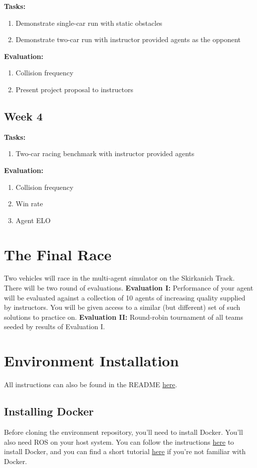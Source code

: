 \documentclass[letta4 paper]{article}
\numberwithin{equation}{section}
\newcommand{\0}{\mathbf{0}}
\begin{document}
	\textbf{Tasks: } \begin{enumerate}
		\item Demonstrate single-car run with static obstacles
		\item Demonstrate two-car run with instructor provided agents as the opponent
	\end{enumerate}
	
	\noindent\textbf{Evaluation: } \begin{enumerate}
		\item Collision frequency
		\item Present project proposal to instructors
	\end{enumerate}

	
	\subsection{Week 4}
	
	\textbf{Tasks: } \begin{enumerate}
		\item Two-car racing benchmark with instructor provided agents
	\end{enumerate}
	
	\noindent\textbf{Evaluation: } \begin{enumerate}
		\item Collision frequency
		\item Win rate
		\item Agent ELO
	\end{enumerate}
	
	\section{The Final Race}
	Two vehicles will race in the multi-agent simulator on the Skirkanich Track. There will be two round of evaluations. \textbf{Evaluation I: }Performance of your agent will be evaluated against a collection of 10 agents of increasing quality supplied by instructors. You will be given access to a similar (but different) set of such solutions to practice on. \textbf{Evaluation II: }Round-robin tournament of all teams seeded by results of Evaluation I.
	
	\section{Environment Installation}
	All instructions can also be found in the README \href{https://github.com/f1tenth/f1tenth_gym_ros}{here}.
	\subsection{Installing Docker}
	Before cloning the environment repository, you'll need to install Docker. You'll also need ROS on your host system. You can follow the instructions \href{https://docs.docker.com/install/linux/docker-ce/ubuntu/}{here} to install Docker, and you can find a short tutorial \href{https://docs.docker.com/get-started/}{here} if you're not familiar with Docker.
	
\end{document}
